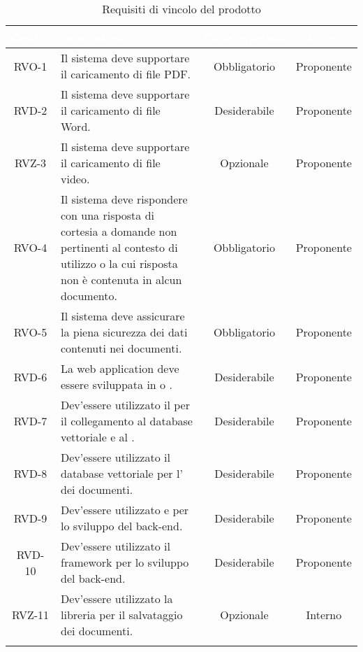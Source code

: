\begingroup
\setlength{\tabcolsep}{10pt}
\renewcommand{\arraystretch}{1.5}
\begin{xltabular}{\textwidth}{| c | X | c | c |}
    \hline
     \textbf{\textcolor{white}{Codice}} & \textbf{\textcolor{white}{Descrizione}} & \textbf{\textcolor{white}{Classificazione}} & \textbf{\textcolor{white}{Fonte}}\\
    \hline
    \endhead
    RVO-1 & Il sistema deve supportare il caricamento di file PDF. & Obbligatorio & Proponente \\
    \hline
    RVD-2 & Il sistema deve supportare il caricamento di  file Word. & Desiderabile & Proponente \\
    \hline
    RVZ-3 & Il sistema deve supportare il caricamento di  file video. & Opzionale & Proponente \\
    \hline
    RVO-4 & Il sistema deve rispondere con una risposta di cortesia a domande  non pertinenti al contesto di utilizzo o la cui risposta non è contenuta in alcun documento. & Obbligatorio & Proponente \\
    \hline
    RVO-5 & Il sistema deve assicurare la piena sicurezza dei dati contenuti nei documenti. & Obbligatorio & Proponente \\
    \hline
    RVD-6 & La web application deve essere sviluppata in  o . & Desiderabile & Proponente \\
    \hline
    RVD-7 & Dev'essere utilizzato il   per il collegamento al database vettoriale e al . & Desiderabile & Proponente \\
    \hline
    RVD-8 & Dev'essere utilizzato il database vettoriale  per l' dei documenti. & Desiderabile & Proponente \\
    \hline
    RVD-9 & Dev'essere utilizzato  e  per lo sviluppo del back-end. & Desiderabile & Proponente \\
    \hline
    RVD-10 & Dev'essere utilizzato il framework  per lo sviluppo del back-end. & Desiderabile & Proponente \\
    \hline
    RVZ-11 & Dev'essere utilizzato la libreria  per il salvataggio dei documenti. & Opzionale & Interno \\
    \hline
     \caption{Requisiti di vincolo del prodotto}
    \label{tab:reqvin}
\end{xltabular}
\endgroup

